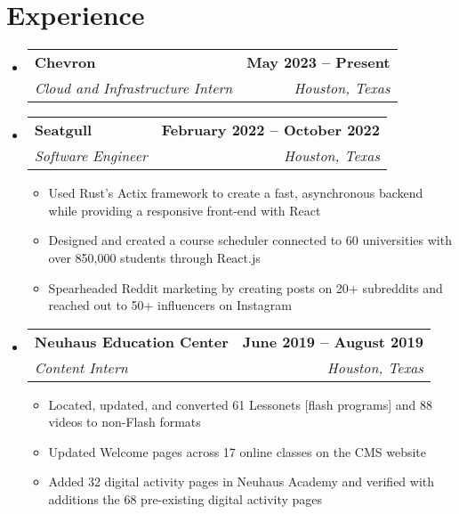 \documentclass[letterpaper,11pt]{article}
\makeatletter
\newcommand{\resumeItem}[1]{
  \item\small{
    {#1 \vspace{-2pt}}
  }
}
\newcommand{\resumeSubheading}[4]{
  \vspace{-2pt}\item
    \begin{tabular*}{1.0\textwidth}[t]{l@{\extracolsep{\fill}}r}
      \textbf{#1} & \textbf{\small #2} \\
      \textit{\small#3} & \textit{\small #4} \\
    \end{tabular*}\vspace{-7pt}
}
\newcommand{\resumeSubHeadingListStart}{\begin{itemize}[leftmargin=0.0in, label={}]}
\newcommand{\resumeSubHeadingListEnd}{\end{itemize}}
\newcommand{\resumeItemListStart}{\begin{itemize}}
\newcommand{\resumeItemListEnd}{\end{itemize}\vspace{-5pt}}
\makeatother
\begin{document}
\section{Experience}
  \resumeSubHeadingListStart
\begin{comment}  
    \resumeSubheading
      {Chevron}{November 2022 -- Present}
      {Incoming Software Engineer Intern}{Houston, Texas}
\end{comment}      
    \resumeSubheading
      {Chevron}{May 2023 -- Present}
      {Cloud and Infrastructure Intern}{Houston, Texas}
      
    \resumeSubheading
      {Seatgull}{February 2022 -- October 2022}
      {Software Engineer}{Houston, Texas}
      \resumeItemListStart
        \resumeItem{Used Rust’s Actix framework to create a fast, asynchronous backend while providing a responsive front-end with React}
        \resumeItem{Designed and created a course scheduler connected to 60 universities with over 850,000 students through React.js}
        \resumeItem{Spearheaded Reddit marketing by creating posts on 20+ subreddits and reached out to 50+ influencers on Instagram}
      \resumeItemListEnd

    \resumeSubheading
      {Neuhaus Education Center}{June 2019 -- August 2019}
      {Content Intern}{Houston, Texas}
      \resumeItemListStart
        \resumeItem{Located, updated, and converted 61 Lessonets [flash programs] and 88 videos to non-Flash formats}
        \resumeItem{Updated Welcome pages across 17 online classes on the CMS website}
        \resumeItem{Added 32 digital activity pages in Neuhaus Academy and verified with additions the 68 pre-existing digital activity pages}
    \resumeItemListEnd
    
  \resumeSubHeadingListEnd
\vspace{-16pt}


\end{document}
